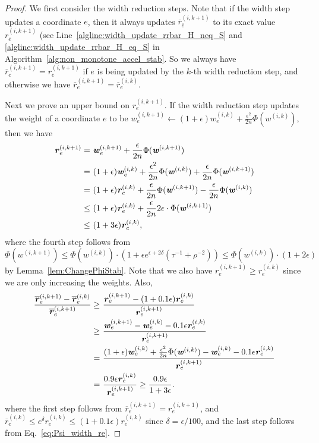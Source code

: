 \documentclass[11pt]{article}
\newcommand\rr{\boldsymbol{\mathit{r}}}
\newcommand\ww{\boldsymbol{\mathit{w}}}
\newcommand{\ov}{\overline}
\begin{document}
\begin{proof}
We first consider the width reduction steps. Note that if the width step updates a coordinate $e$, then it always updates $\ov{\rr}^{(i,k+1)}_{\ov{e}}$ to its exact value $\rr^{(i,k+1)}_{\ov{e}}$ (see Line~\ref{algline:width_update_rrbar_H_neq_S} and \ref{algline:width_update_rrbar_H_eq_S} in Algorithm~\ref{alg:non_monotone_accel_stab}. So we always have $\ov{\rr}^{(i,k+1)}_{e} = \rr^{(i,k+1)}_{e}$ if $e$ is being updated by the $k$-th width reduction step, and otherwise we have $\ov{\rr}^{(i,k+1)}_{e} = \ov{\rr}^{(i,k)}_{e}$.

Next we prove an upper bound on $\rr^{(i,k+1)}_e$. If the width reduction step updates the weight of a coordinate $e$ to be $\ww_e^{(i,k+1)}\gets (1+\epsilon)\ww_e^{(i,k)} + \frac{\epsilon^2}{2n} \Phi(\ww^{(i,k)})$, then we have 
\begin{align}\label{eq:Psi_width_re}
\rr^{(i,k+1)}_e = &~ \ww^{(i,k+1)}_e + \frac{\epsilon}{2n} \Phi(\ww^{(i,k+1)}) \notag \\
= &~ (1 + \epsilon) \ww^{(i,k)}_e + \frac{\epsilon^2}{2n} \Phi(\ww^{(i,k)}) + \frac{\epsilon}{2n} \Phi(\ww^{(i,k+1)}) \notag \\
= &~ (1 + \epsilon) \rr^{(i,k)}_e + \frac{\epsilon}{2n} \Phi(\ww^{(i,k+1)}) - \frac{\epsilon}{2n} \Phi(\ww^{(i,k)}) \notag \\
\leq &~ (1 + \epsilon) \rr^{(i,k)}_e + \frac{\epsilon}{2n} 2\epsilon \cdot \Phi(\ww^{(i,k+1)}) \notag \\
\leq &~ (1 + 3 \epsilon) \rr^{(i,k)}_e,
\end{align}
where the fourth step follows from $\Phi(\ww^{(i,k+1)}) \leq \Phi(\ww^{(i,k)}) \cdot (1 +  \epsilon e^{\epsilon+2\delta} (\tau^{-1} + \rho^{-2})) \leq \Phi(\ww^{(i,k)}) \cdot (1 + 2 \epsilon)$ by Lemma~\ref{lem:ChangePhiStab}. Note that we also have $\rr^{(i,k+1)}_e \geq \rr^{(i,k)}_e$ since we are only increasing the weights. Also,
\begin{align}\label{eq:Psi_width_re_diff}
\frac{\ov{\rr}^{(i,k+1)}_e - \ov{\rr}^{(i,k)}_e}{\ov{\rr}^{(i,k+1)}_e} \geq &~ \frac{\rr^{(i,k+1)}_e - (1 + 0.1 \epsilon) \rr^{(i,k)}_e}{\rr^{(i,k+1)}_e} \notag \\
\geq &~ \frac{\ww^{(i,k+1)}_e - \ww^{(i,k)}_e - 0.1 \epsilon \rr^{(i,k)}_e}{\rr^{(i,k+1)}_e} \notag \\
= &~ \frac{(1+\epsilon)\ww_e^{(i,k)} + \frac{\epsilon^2}{2n}\Phi(\ww^{(i,k)}) - \ww_e^{(i,k)} - 0.1 \epsilon \rr^{(i,k)}_e}{\rr^{(i,k+1)}_e} \notag \\
= &~ \frac{0.9 \epsilon \rr^{(i,k)}_e}{\rr^{(i,k+1)}_e}
\geq \frac{0.9 \epsilon}{1 + 3 \epsilon}.
\end{align}
where the first step follows from $\ov{\rr}^{(i,k+1)}_e = \rr^{(i,k+1)}_e$, and $\ov{\rr}^{(i,k)}_e \leq e^{\delta} \rr^{(i,k)}_e \leq (1 + 0.1 \epsilon) \rr^{(i,k)}_e$ since $\delta = \epsilon/100$, and the last step follows from Eq.~\eqref{eq:Psi_width_re}.



\end{proof}
\end{document}
